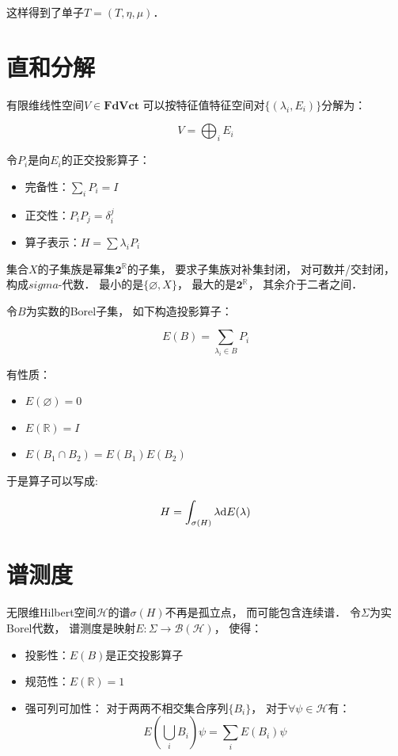 \documentclass[10pt, openany]{book}
\begin{document}
这样得到了单子$T = (T,\eta,\mu)$．

\section{直和分解}

有限维线性空间$V\in\textbf{FdVct}$
可以按特征值特征空间对$\{(\lambda_i,E_i)\}$分解为：

$$
V = \bigoplus_i E_i
$$

令$P_i$是向$E_i$的正交投影算子：
\begin{itemize}
    \item 完备性：$\sum_i P_i = I$
    \item 正交性：$P_iP_j = \delta_i^j$
    \item 算子表示：$H = \sum \lambda_i P_i$
\end{itemize}

集合$X$的子集族是幂集$\textbf{2}^\mathbb R$的子集，
要求子集族对补集封闭，
对可数并/交封闭，
构成$sigma$-代数．
最小的是$\{\varnothing,X\}$，
最大的是$\textbf{2}^\mathbb R$，
其余介于二者之间．

令$B$为实数的Borel子集，
如下构造投影算子：

$$
E(B) = \sum_{\lambda_i \in B} P_i
$$

有性质：
\begin{itemize}
    \item $E(\varnothing) = 0$
    \item $E(\mathbb R) = I$
    \item $E(B_1 \cap B_2) = E(B_1)E(B_2)$
\end{itemize}

于是算子可以写成:

$$
H = \int_{\sigma(H)} \lambda \text d E(\lambda)
$$

\section{谱测度}

无限维Hilbert空间$\mathcal H$的谱$\sigma(H)$不再是孤立点，
而可能包含连续谱．
令$\Sigma$为实Borel代数，
谱测度是映射$E: \Sigma \to \mathcal B(\mathcal H)$，
使得：
\begin{itemize}
    \item 投影性：$E(B)$是正交投影算子
    \item 规范性：$E(\mathbb R) = 1$
    \item 强可列可加性：
    对于两两不相交集合序列$\{B_i\}$，
    对于$\forall \psi \in \mathcal H$有：
    $$
    E\left( \bigcup_i B_i \right) \psi = \sum_i E(B_i) \psi
    $$
\end{itemize}
\end{document}
